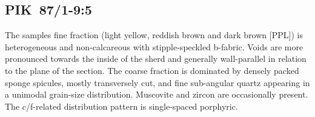 \documentclass[a4paper]{article}
\begin{document}
\begin{figure}[H]
	\caption{}
	\label{fig:56_pik}
\end{figure}

\newpage\subsection{PIK~87/1-9:5 \citep[pik\#54; Fig.~\ref{fig:pik.pottery}.4; Pikunda-Munda style;][428 Pl.~47.7]{Seidensticker.2021e}}

\begin{multicols}{2}
\noindent The samples fine fraction (light yellow, reddish brown and dark brown [PPL]) is heterogeneous and non-calcareous with stipple-speckled b-fabric. Voids are more pronounced towards the inside of the sherd and generally wall-parallel in relation to the plane of the section. The coarse fraction is dominated by densely packed sponge spicules, mostly transversely cut, and fine sub-angular quartz appearing in a unimodal grain-size distribution. Muscovite and zircon are occasionally present. The c/f-related distribution pattern is single-spaced porphyric.
\end{multicols}
\end{document}
